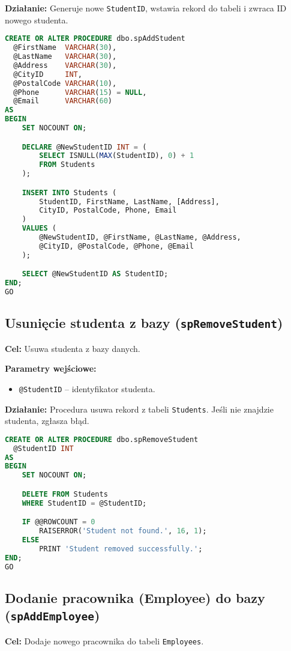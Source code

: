 \documentclass[12pt]{article}
\begin{document}
\textbf{Działanie:} Generuje nowe \verb|StudentID|, wstawia rekord do tabeli i zwraca ID nowego studenta.

\begin{lstlisting}[language=SQL]
CREATE OR ALTER PROCEDURE dbo.spAddStudent
  @FirstName  VARCHAR(30),
  @LastName   VARCHAR(30),
  @Address    VARCHAR(30),
  @CityID     INT,
  @PostalCode VARCHAR(10),
  @Phone      VARCHAR(15) = NULL,
  @Email      VARCHAR(60)
AS
BEGIN
    SET NOCOUNT ON;

    DECLARE @NewStudentID INT = (
        SELECT ISNULL(MAX(StudentID), 0) + 1
        FROM Students
    );

    INSERT INTO Students (
        StudentID, FirstName, LastName, [Address],
        CityID, PostalCode, Phone, Email
    )
    VALUES (
        @NewStudentID, @FirstName, @LastName, @Address,
        @CityID, @PostalCode, @Phone, @Email
    );

    SELECT @NewStudentID AS StudentID;
END;
GO
\end{lstlisting}

\newpage
\subsection{Usunięcie studenta z bazy (\texttt{spRemoveStudent})}
\textbf{Cel:} Usuwa studenta z bazy danych.

\textbf{Parametry wejściowe:}
\begin{itemize}
  \item \verb|@StudentID| – identyfikator studenta.
\end{itemize}

\textbf{Działanie:} Procedura usuwa rekord z tabeli \verb|Students|. Jeśli nie znajdzie studenta, zgłasza błąd.

\begin{lstlisting}[language=SQL]
CREATE OR ALTER PROCEDURE dbo.spRemoveStudent
  @StudentID INT
AS
BEGIN
    SET NOCOUNT ON;

    DELETE FROM Students
    WHERE StudentID = @StudentID;

    IF @@ROWCOUNT = 0
        RAISERROR('Student not found.', 16, 1);
    ELSE
        PRINT 'Student removed successfully.';
END;
GO
\end{lstlisting}

\newpage
\subsection{Dodanie pracownika (Employee) do bazy (\texttt{spAddEmployee})}
\textbf{Cel:} Dodaje nowego pracownika do tabeli \verb|Employees|.
\end{document}
